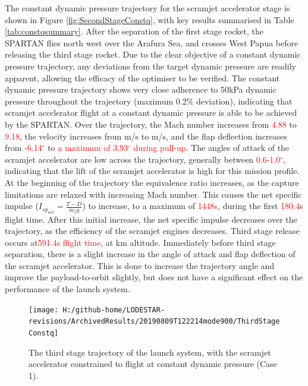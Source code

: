 The constant dynamic pressure trajectory for the scramjet accelerator stage is shown in Figure \ref{fig:SecondStageConstq}, with key results summarised in Table \ref{tab:constqsummary}. After the separation of the first stage rocket, the SPARTAN flies north west over the Arafura Sea, and crosses West Papua before releasing the third stage rocket. Due to the clear objective of a constant dynamic pressure trajectory, any deviations from the target dynamic pressure are readily apparent, allowing the efficacy of the optimiser to be verified. 
The constant dynamic pressure trajectory shows very close adherence to 50kPa dynamic pressure  throughout the trajectory (maximum 0.2\% deviation), indicating that scramjet accelerator flight at a constant dynamic pressure is able to be achieved by the SPARTAN.  
Over the trajectory, the Mach number increases from \textcolor{red}{4.88} to \textcolor{red}{9.18}, the velocity increases from \firstsecondSeparationvConstqNoReturn m/s to \secondthirdSeparationvConstqNoReturn m/s, and the flap deflection increases from \textcolor{red}{-6.14}$^\circ$ to \textcolor{red}{a maximum of 3.93$^\circ$ during pull-up}. The angles of attack of the scramjet accelerator are low across the trajectory, generally between \textcolor{red}{0.6-1.0}$^\circ$, indicating that the lift of the scramjet accelerator is high for this mission profile. At the beginning of the trajectory the equivalence ratio increases, as the capture limitations are relaxed with increasing Mach number. This causes the net specific impulse ($I_{sp_{net}} = \frac{T-D}{\dot{m}_f g}$) to increase, to a maximum of \textcolor{red}{1448s}, during the first \textcolor{red}{180.4}s flight time.  After this initial increase, the net specific impulse decreases over the trajectory, as the efficiency of the scramjet engines decreases. 
Third stage release occurs at\textcolor{red}{591.4s flight time}, at \secondthirdSeparationAltConstqNoReturn km altitude. Immediately before third stage separation, there is a slight increase in the angle of attack and flap deflection of the scramjet accelerator. This is done to increase the trajectory angle and improve the payload-to-orbit slightly, but does not have a significant effect on the performance of the launch system. 

\begin{figure}[ht!]%
\centering
\texttt{[image: H:/github-home/LODESTAR-revisions/ArchivedResults/20190809T122214mode900/ThirdStageConstq]}
\caption{The third stage trajectory of the launch system, with the scramjet accelerator constrained to flight at constant dynamic pressure (Case 1).}
\label{fig:ThirdStageConstq}
\end{figure}

